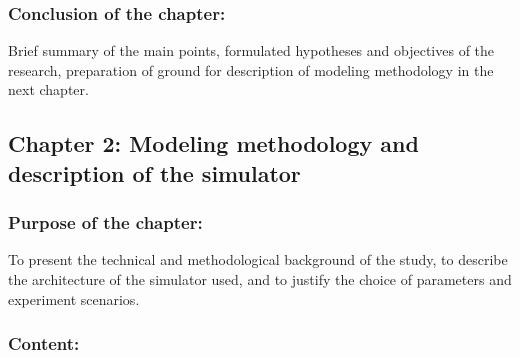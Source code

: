 \subsubsection{Conclusion of the chapter:}

Brief summary of the main points, formulated hypotheses and objectives of the research, preparation of ground for description of modeling methodology in the next chapter.

\subsection{Chapter 2: Modeling methodology and description of the simulator}

\subsubsection{Purpose of the chapter:}

To present the technical and methodological background of the study, to describe the architecture of the simulator used, and to justify the choice of parameters and experiment scenarios.

\subsubsection{Content:}

